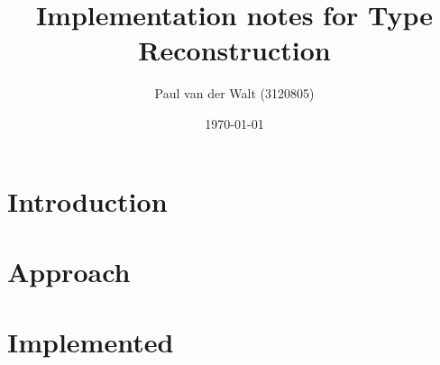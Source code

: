 \documentclass[a4paper]{article}
\author{Paul van der Walt (3120805)}
\date{\today}
\title{Implementation notes for Type Reconstruction}
\begin{document}
\maketitle
\tableofcontents

\section{Introduction}


\section{Approach}


\section{Implemented}
\end{document}
